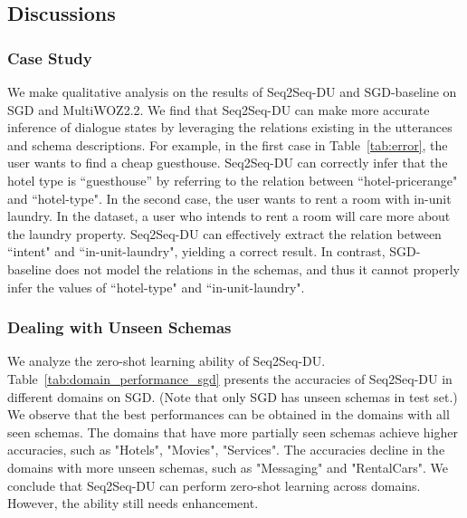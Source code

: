 \documentclass[11pt]{article}
\begin{document}
\subsection{Discussions}

\subsubsection*{Case Study}

We make qualitative analysis on the results of Seq2Seq-DU and SGD-baseline on SGD and MultiWOZ2.2. We find that Seq2Seq-DU can make more accurate inference of dialogue states by leveraging the relations existing in the utterances and schema descriptions.
For example, in the first case in Table~\ref{tab:error}, the user wants to find a cheap guesthouse. Seq2Seq-DU can correctly infer that the hotel type is ``guesthouse” by referring to the relation between ``hotel-pricerange" and ``hotel-type". In the second case, the user wants to rent a room with in-unit laundry. In the dataset, a user who intends to rent a room will care more about the laundry property. Seq2Seq-DU can effectively extract the relation between ``intent" and ``in-unit-laundry", yielding a correct result. In contrast, SGD-baseline does not model the relations in the schemas, and thus it cannot properly infer the values of ``hotel-type" and ``in-unit-laundry". 



\subsubsection*{Dealing with Unseen Schemas}

We analyze the zero-shot learning ability of Seq2Seq-DU.
Table~\ref{tab:domain_performance_sgd} presents the accuracies of Seq2Seq-DU in different domains on SGD. (Note that only SGD has unseen schemas in test set.) We observe that the best performances can be obtained in the domains with all seen schemas. The domains that have more partially seen schemas achieve higher accuracies, such as "Hotels", "Movies", "Services". The accuracies decline in the domains with more unseen schemas, such as "Messaging" and "RentalCars". We conclude that Seq2Seq-DU can perform zero-shot learning across domains. However, the ability still needs enhancement. 
\end{document}
